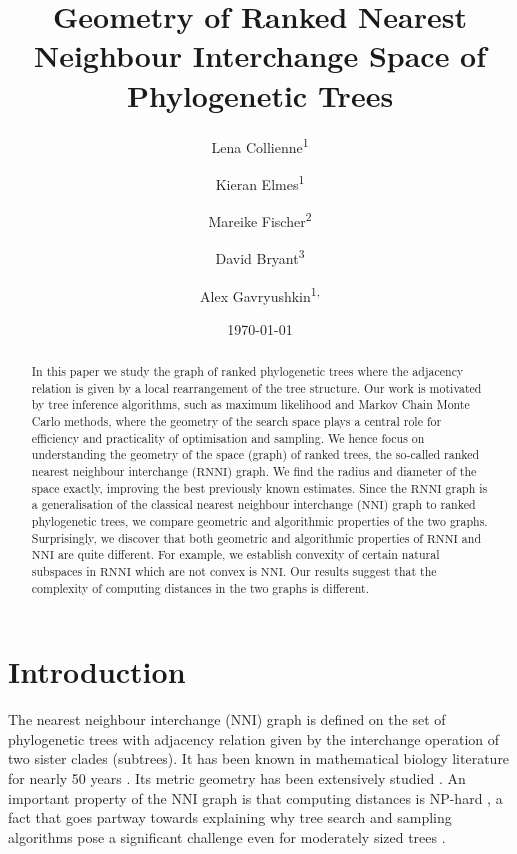 \documentclass{amsart}
\title[Ranked Nearest Neighbour Interchange]{Geometry of Ranked Nearest Neighbour Interchange Space of Phylogenetic Trees}
\date{\today}
\author{Lena Collienne\textsuperscript{1}}
\author{Kieran Elmes\textsuperscript{1}}
\author{Mareike Fischer\textsuperscript{2}}
\author{David Bryant\textsuperscript{3}}
\author{Alex Gavryushkin\textsuperscript{1, \Letter}}
\newcommand{\nni}{\mathrm{NNI}}
\newcommand{\rnni}{\mathrm{RNNI}}
\begin{document}
\begin{abstract}
In this paper we study the graph of ranked phylogenetic trees where the adjacency relation is given by a local rearrangement of the tree structure.
Our work is motivated by tree inference algorithms, such as maximum likelihood and Markov Chain Monte Carlo methods, where the geometry of the search space plays a central role for efficiency and practicality of optimisation and sampling.
We hence focus on understanding the geometry of the space (graph) of ranked trees, the so-called ranked nearest neighbour interchange ($\rnni$) graph.
We find the radius and diameter of the space exactly, improving the best previously known estimates.
Since the $\rnni$ graph is a generalisation of the classical nearest neighbour interchange ($\nni$) graph to ranked phylogenetic trees, we compare geometric and algorithmic properties of the two graphs.
Surprisingly, we discover that both geometric and algorithmic properties of $\rnni$ and $\nni$ are quite different.
For example, we establish convexity of certain natural subspaces in $\rnni$ which are not convex is $\nni$.
Our results suggest that the complexity of computing distances in the two graphs is different.
\end{abstract}


\maketitle

\section{Introduction}

The nearest neighbour interchange ($\nni$) graph is defined on the set of phylogenetic trees with adjacency relation given by the interchange operation of two sister clades (subtrees).
It has been known in mathematical biology literature for nearly 50 years \autocite{Robinson1971-ql,Moore1973-kk}.
Its metric geometry has been extensively studied \autocite{Dasgupta2000-xa, Li1996-zw, Gordon2013-fw, De_Jong2016-al}.
An important property of the $\nni$ graph is that computing distances is NP-hard \autocite{Dasgupta2000-xa}, a fact that goes partway towards explaining why tree search and sampling algorithms pose a significant challenge even for moderately sized trees
\autocite{Whidden2016-kl}.
\end{document}
